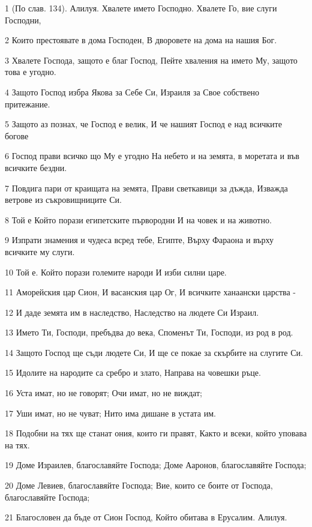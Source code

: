 \par 1 (По слав. 134). Алилуя. Хвалете името Господно. Хвалете Го, вие слуги Господни,
\par 2 Които престоявате в дома Господен, В дворовете на дома на нашия Бог.
\par 3 Хвалете Господа, защото е благ Господ, Пейте хваления на името Му, защото това е угодно.
\par 4 Защото Господ избра Якова за Себе Си, Израиля за Свое собствено притежание.
\par 5 Защото аз познах, че Господ е велик, И че нашият Господ е над всичките богове
\par 6 Господ прави всичко що Му е угодно На небето и на земята, в моретата и във всичките бездни.
\par 7 Повдига пари от краищата на земята, Прави светкавици за дъжда, Изважда ветрове из съкровищниците Си.
\par 8 Той е Който порази египетските първородни И на човек и на животно.
\par 9 Изпрати знамения и чудеса всред тебе, Египте, Върху Фараона и върху всичките му слуги.
\par 10 Той е. Който порази големите народи И изби силни царе.
\par 11 Аморейския цар Сион, И васанския цар Ог, И всичките ханаански царства -
\par 12 И даде земята им в наследство, Наследство на людете Си Израил.
\par 13 Името Ти, Господи, пребъдва до века, Споменът Ти, Господи, из род в род.
\par 14 Защото Господ ще съди людете Си, И ще се покае за скърбите на слугите Си.
\par 15 Идолите на народите са сребро и злато, Направа на човешки ръце.
\par 16 Уста имат, но не говорят; Очи имат, но не виждат;
\par 17 Уши имат, но не чуват; Нито има дишане в устата им.
\par 18 Подобни на тях ще станат ония, които ги правят, Както и всеки, който уповава на тях.
\par 19 Доме Израилев, благославяйте Господа; Доме Ааронов, благославяйте Господа;
\par 20 Доме Левиев, благославяйте Господа; Вие, които се боите от Господа, благославяйте Господа;
\par 21 Благословен да бъде от Сион Господ, Който обитава в Ерусалим. Алилуя.

